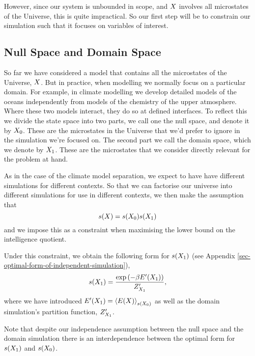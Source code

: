 \documentclass[]{article}
\begin{document}
However, since our system is unbounded in scope, and $X$ involves all microstates of the Universe, this is quite impractical. So our first step will be to constrain our simulation such that it focuses on variables of interest.

\subsection{Null Space and Domain Space}

So far we have considered a model that contains all the microstates of the Universe, $X$. But in practice, when modelling we normally focus on a particular domain. For example, in climate modelling we develop detailed models of the oceans independently from models of the chemistry of the upper atmosphere. Where these two models interact, they do so at defined interfaces. To reflect this we divide the state space into two parts, we call one the null space, and denote it by ${X_0}$. These are the microstates in the Universe that we'd prefer to ignore in the simulation we're focused on. The second part we call the domain space, which we denote by ${X_1}$. These are the microstates that we consider directly relevant for the problem at hand. 

As in the case of the climate model separation, we expect to have have different simulations for different contexts. So that we can factorise our universe into different simulations for use in different contexts, we then make the assumption that
\[
s(X) = s({X_0}) s({X_1})
\]
and we impose this as a constraint when maximising the lower bound on the intelligence quotient.

Under this constraint, we obtain the following form for $s({X_1})$ (see Appendix \ref{sec-optimal-form-of-independent-simulation}),
\[
s({X_1}) = \frac{\exp \left(-\beta E^\prime({X_1})\right)}{Z^\prime_{X_1}},
\]
where we have introduced $E^\prime({X_1}) = \left\langle E(X) \right\rangle_{s({X_0})}$ as well as the domain simulation's partition function, $Z^\prime_{X_1}$.

Note that despite our independence assumption between the null space and the domain simulation there is an interdependence between the optimal form for $s({X_1})$ and $s({X_0})$. 
\end{document}
